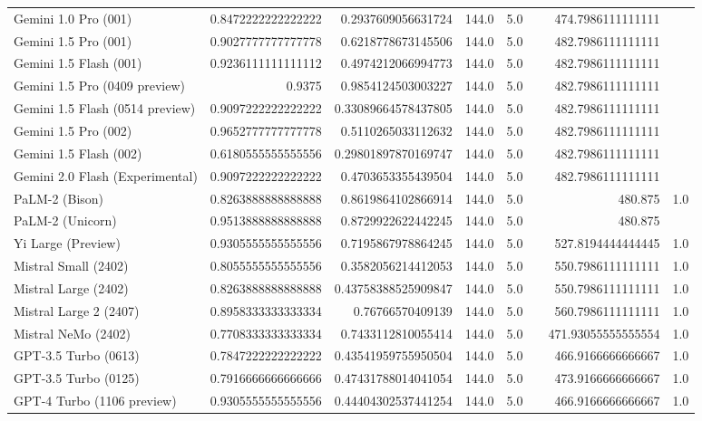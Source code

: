 \begin{table}[htp]
{\begin{tabular}{lrrrrrrr}
Gemini 1.0 Pro (001) & 0.8472222222222222 & 0.2937609056631724 & 144.0 & 5.0 &  & 474.7986111111111 &  \\
Gemini 1.5 Pro (001) & 0.9027777777777778 & 0.6218778673145506 & 144.0 & 5.0 &  & 482.7986111111111 &  \\
Gemini 1.5 Flash (001) & 0.9236111111111112 & 0.4974212066994773 & 144.0 & 5.0 &  & 482.7986111111111 &  \\
Gemini 1.5 Pro (0409 preview) & 0.9375 & 0.9854124503003227 & 144.0 & 5.0 &  & 482.7986111111111 &  \\
Gemini 1.5 Flash (0514 preview) & 0.9097222222222222 & 0.33089664578437805 & 144.0 & 5.0 &  & 482.7986111111111 &  \\
Gemini 1.5 Pro (002) & 0.9652777777777778 & 0.5110265033112632 & 144.0 & 5.0 &  & 482.7986111111111 &  \\
Gemini 1.5 Flash (002) & 0.6180555555555556 & 0.29801897870169747 & 144.0 & 5.0 &  & 482.7986111111111 &  \\
Gemini 2.0 Flash (Experimental) & 0.9097222222222222 & 0.4703653355439504 & 144.0 & 5.0 &  & 482.7986111111111 &  \\
PaLM-2 (Bison) & 0.8263888888888888 & 0.8619864102866914 & 144.0 & 5.0 &  & 480.875 & 1.0 \\
PaLM-2 (Unicorn) & 0.9513888888888888 & 0.8729922622442245 & 144.0 & 5.0 &  & 480.875 &  \\
Yi Large (Preview) & 0.9305555555555556 & 0.7195867978864245 & 144.0 & 5.0 &  & 527.8194444444445 & 1.0 \\
Mistral Small (2402) & 0.8055555555555556 & 0.3582056214412053 & 144.0 & 5.0 &  & 550.7986111111111 & 1.0 \\
Mistral Large (2402) & 0.8263888888888888 & 0.43758388525909847 & 144.0 & 5.0 &  & 550.7986111111111 & 1.0 \\
Mistral Large 2 (2407) & 0.8958333333333334 & 0.76766570409139 & 144.0 & 5.0 &  & 560.7986111111111 & 1.0 \\
Mistral NeMo (2402) & 0.7708333333333334 & 0.7433112810055414 & 144.0 & 5.0 &  & 471.93055555555554 & 1.0 \\
GPT-3.5 Turbo (0613) & 0.7847222222222222 & 0.43541959755950504 & 144.0 & 5.0 &  & 466.9166666666667 & 1.0 \\
GPT-3.5 Turbo (0125) & 0.7916666666666666 & 0.47431788014041054 & 144.0 & 5.0 &  & 473.9166666666667 & 1.0 \\
GPT-4 Turbo (1106 preview) & 0.9305555555555556 & 0.44404302537441254 & 144.0 & 5.0 &  & 466.9166666666667 & 1.0 \\

\end{tabular}}
\end{table}
